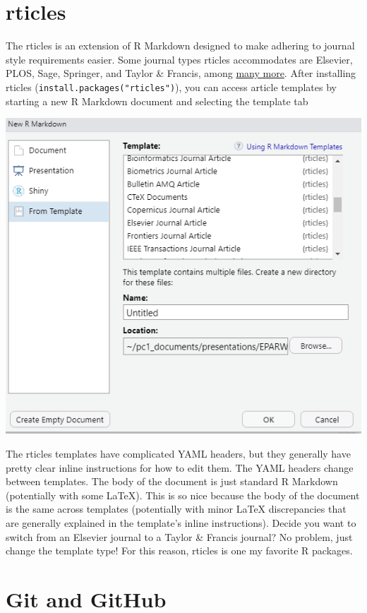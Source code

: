 \documentclass[
]{book}
\begin{document}
\hypertarget{rticles}{%
\section{rticles}\label{rticles}}

The rticles is an extension of R Markdown designed to make adhering to journal style requirements easier. Some journal types rticles accommodates are Elsevier, PLOS, Sage, Springer, and Taylor \& Francis, among \href{https://github.com/rstudio/rticles}{many more}. After installing rticles (\texttt{install.packages("rticles")}), you can access article templates by starting a new R Markdown document and selecting the template tab

\includegraphics[width=1\linewidth]{images/rmark2}

The rticles templates have complicated YAML headers, but they generally have pretty clear inline instructions for how to edit them. The YAML headers change between templates. The body of the document is just standard R Markdown (potentially with some LaTeX). This is so nice because the body of the document is the same across templates (potentially with minor LaTeX discrepancies that are generally explained in the template's inline instructions). Decide you want to switch from an Elsevier journal to a Taylor \& Francis journal? No problem, just change the template type! For this reason, rticles is one my favorite R packages.

\hypertarget{git-github}{%
\section{Git and GitHub}\label{git-github}}
\end{document}
